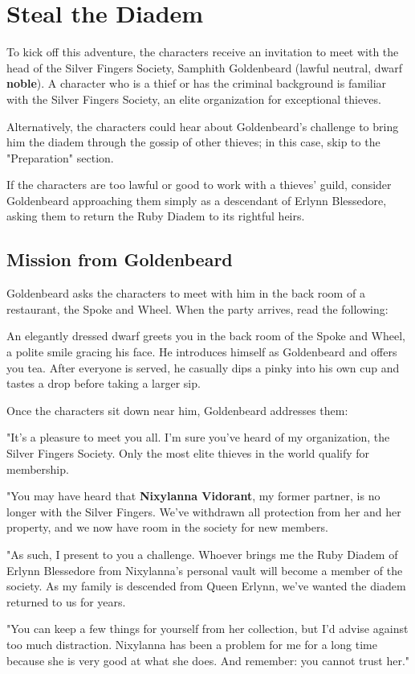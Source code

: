 \documentclass[10pt,a4paper,twoside,bg=print,twocolumn,openany,nodeprecatedcode]{dndbook}
\begin{document}
\section{Steal the Diadem}
To kick off this adventure, the characters receive an invitation to meet with the head of the Silver Fingers Society, Samphith Goldenbeard (lawful neutral, dwarf \textbf{noble}). A character who is a thief or has the criminal background is familiar with the Silver Fingers Society, an elite organization for exceptional thieves.

Alternatively, the characters could hear about Goldenbeard's challenge to bring him the diadem through the gossip of other thieves; in this case, skip to the "Preparation" section.

If the characters are too lawful or good to work with a thieves' guild, consider Goldenbeard approaching them simply as a descendant of Erlynn Blessedore, asking them to return the Ruby Diadem to its rightful heirs.

\subsection{Mission from Goldenbeard}
Goldenbeard asks the characters to meet with him in the back room of a restaurant, the Spoke and Wheel. When the party arrives, read the following:

\begin{DndReadAloud}{}
An elegantly dressed dwarf greets you in the back room of the Spoke and Wheel, a polite smile gracing his face. He introduces himself as Goldenbeard and offers you tea. After everyone is served, he casually dips a pinky into his own cup and tastes a drop before taking a larger sip.

\end{DndReadAloud}

Once the characters sit down near him, Goldenbeard addresses them:

\begin{DndReadAloud}{}
"It's a pleasure to meet you all. I'm sure you've heard of my organization, the Silver Fingers Society. Only the most elite thieves in the world qualify for membership.

"You may have heard that \textbf{Nixylanna Vidorant}, my former partner, is no longer with the Silver Fingers. We've withdrawn all protection from her and her property, and we now have room in the society for new members.

"As such, I present to you a challenge. Whoever brings me the Ruby Diadem of Erlynn Blessedore from Nixylanna's personal vault will become a member of the society. As my family is descended from Queen Erlynn, we've wanted the diadem returned to us for years.

"You can keep a few things for yourself from her collection, but I'd advise against too much distraction. Nixylanna has been a problem for me for a long time because she is very good at what she does. And remember: you cannot trust her."

\end{DndReadAloud}
\end{document}

